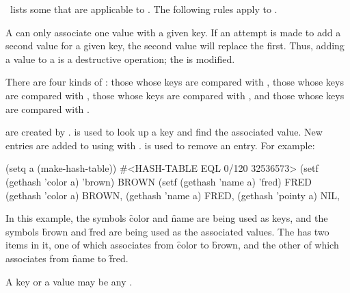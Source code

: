 

\Thenextfigure\ lists some  that are applicable 
to .  The following rules apply to .

\beginlist
\itemitem{--}
A  can only associate one value with a given
key. If an attempt is made to add a second value for a given key,
the second value will replace the first.
Thus, adding a value to a  is a destructive operation;
the  is modified.  

\itemitem{--}
There are four kinds of :
  those whose keys are compared with ,
  those whose keys are compared with ,
  those whose keys are compared with , and
  those whose keys are compared with .  

\itemitem{--}
 are created by . 
 is used to look up a key and find the associated value.
New entries are added to  using  with .
 is used to remove an entry.
For example:

\code
 (setq a (make-hash-table)) \EV #<HASH-TABLE EQL 0/120 32536573>
 (setf (gethash 'color a) 'brown) \EV BROWN
 (setf (gethash 'name a) 'fred) \EV FRED
 (gethash 'color a) \EV BROWN, 
 (gethash 'name a) \EV FRED, 
 (gethash 'pointy a) \EV NIL, 
\endcode

In this example, the symbols \f{color} and \f{name} are being used as
keys, and the symbols \f{brown} and \f{fred} are being used as the
associated values.  The  
has two items in it, one of which                              
associates from \f{color} to \f{brown}, and the other of which
associates from \f{name} to \f{fred}.

\itemitem{--}
A key or a value may be any .

% 

